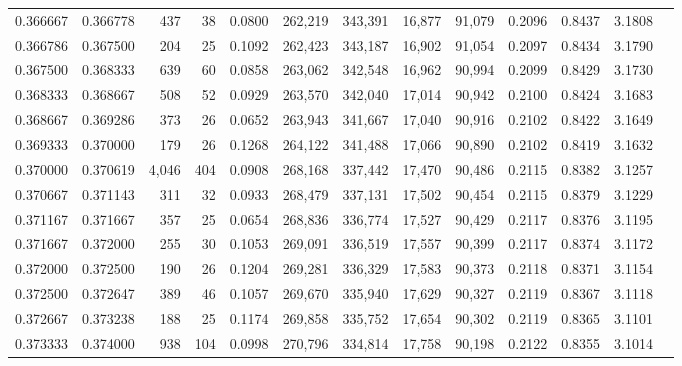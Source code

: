 \begin{tabular}{rrrrrrrrrrrrr}
0.366667 & 0.366778 &   437 &  38 &                                     0.0800 & 262,219 & 343,391 &  16,877 &  91,079 & 0.2096 & 0.8437 & 3.1808 \\
0.366786 & 0.367500 &   204 &  25 &                                     0.1092 & 262,423 & 343,187 &  16,902 &  91,054 & 0.2097 & 0.8434 & 3.1790 \\
0.367500 & 0.368333 &   639 &  60 &                                     0.0858 & 263,062 & 342,548 &  16,962 &  90,994 & 0.2099 & 0.8429 & 3.1730 \\
0.368333 & 0.368667 &   508 &  52 &                                     0.0929 & 263,570 & 342,040 &  17,014 &  90,942 & 0.2100 & 0.8424 & 3.1683 \\
0.368667 & 0.369286 &   373 &  26 &                                     0.0652 & 263,943 & 341,667 &  17,040 &  90,916 & 0.2102 & 0.8422 & 3.1649 \\
0.369333 & 0.370000 &   179 &  26 &                                     0.1268 & 264,122 & 341,488 &  17,066 &  90,890 & 0.2102 & 0.8419 & 3.1632 \\
0.370000 & 0.370619 & 4,046 & 404 &                                     0.0908 & 268,168 & 337,442 &  17,470 &  90,486 & 0.2115 & 0.8382 & 3.1257 \\
0.370667 & 0.371143 &   311 &  32 &                                     0.0933 & 268,479 & 337,131 &  17,502 &  90,454 & 0.2115 & 0.8379 & 3.1229 \\
0.371167 & 0.371667 &   357 &  25 &                                     0.0654 & 268,836 & 336,774 &  17,527 &  90,429 & 0.2117 & 0.8376 & 3.1195 \\
0.371667 & 0.372000 &   255 &  30 &                                     0.1053 & 269,091 & 336,519 &  17,557 &  90,399 & 0.2117 & 0.8374 & 3.1172 \\
0.372000 & 0.372500 &   190 &  26 &                                     0.1204 & 269,281 & 336,329 &  17,583 &  90,373 & 0.2118 & 0.8371 & 3.1154 \\
0.372500 & 0.372647 &   389 &  46 &                                     0.1057 & 269,670 & 335,940 &  17,629 &  90,327 & 0.2119 & 0.8367 & 3.1118 \\
0.372667 & 0.373238 &   188 &  25 &                                     0.1174 & 269,858 & 335,752 &  17,654 &  90,302 & 0.2119 & 0.8365 & 3.1101 \\
0.373333 & 0.374000 &   938 & 104 &                                     0.0998 & 270,796 & 334,814 &  17,758 &  90,198 & 0.2122 & 0.8355 & 3.1014 \\

\end{tabular}

